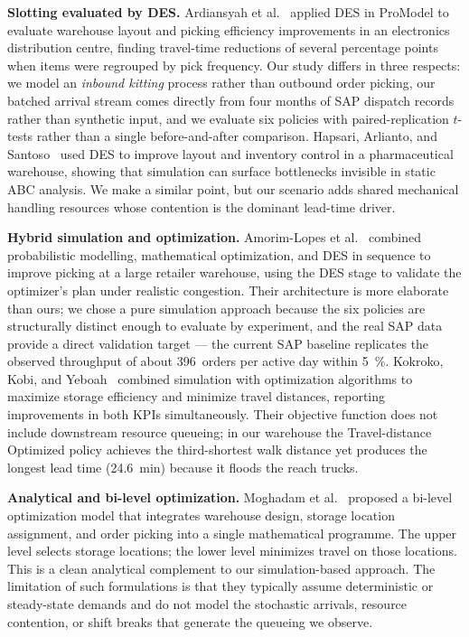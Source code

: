 \medskip
\noindent\textbf{Slotting evaluated by DES.}
Ardiansyah et al.~\cite{ardiansyah2024} applied DES in ProModel to evaluate
warehouse layout and picking efficiency improvements in an electronics
distribution centre, finding travel-time reductions of several percentage
points when items were regrouped by pick frequency.
Our study differs in three respects: we model an \emph{inbound kitting}
process rather than outbound order picking, our batched arrival stream comes
directly from four months of SAP dispatch records rather than synthetic
input, and we evaluate six policies with paired-replication $t$-tests
rather than a single before-and-after comparison.
Hapsari, Arlianto, and Santoso~\cite{hapsari2025} used DES to improve layout
and inventory control in a pharmaceutical warehouse, showing that simulation
can surface bottlenecks invisible in static ABC analysis.
We make a similar point, but our scenario adds shared mechanical handling
resources whose contention is the dominant lead-time driver.

\medskip
\noindent\textbf{Hybrid simulation and optimization.}
Amorim-Lopes et al.~\cite{amorim2021} combined probabilistic modelling,
mathematical optimization, and DES in sequence to improve picking at a large
retailer warehouse, using the DES stage to validate the optimizer's plan
under realistic congestion.
Their architecture is more elaborate than ours; we chose a pure simulation
approach because the six policies are structurally distinct enough to
evaluate by experiment, and the real SAP data provide a direct validation
target — the current SAP baseline replicates the observed throughput of
about 396~orders per active day within \SI{5}{\percent}.
Kokroko, Kobi, and Yeboah~\cite{kokroko2025} combined simulation with
optimization algorithms to maximize storage efficiency and minimize travel
distances, reporting improvements in both KPIs simultaneously.
Their objective function does not include downstream resource queueing; in
our warehouse the Travel-distance Optimized policy achieves the
third-shortest walk distance yet produces the longest lead time
(\SI{24.6}{\minute}) because it floods the reach trucks.

\medskip
\noindent\textbf{Analytical and bi-level optimization.}
Moghadam et al.~\cite{moghadam2025} proposed a bi-level optimization model
that integrates warehouse design, storage location assignment, and order
picking into a single mathematical programme.
The upper level selects storage locations; the lower level minimizes travel
on those locations.
This is a clean analytical complement to our simulation-based approach.
The limitation of such formulations is that they typically assume
deterministic or steady-state demands and do not model the stochastic
arrivals, resource contention, or shift breaks that generate the queueing
we observe.

